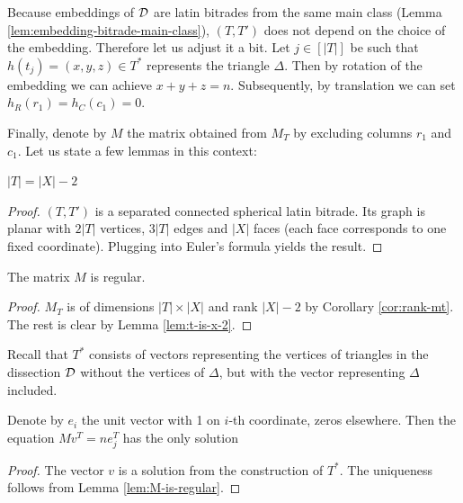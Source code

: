 Because embeddings of $\mathcal D$ are latin bitrades from the same main class (Lemma \ref{lem:embedding-bitrade-main-class}), $(T,T')$ does not depend on the choice of the embedding. Therefore let us adjust it a bit. Let $j \in [|T|]$ be such that $h(t_j) = (x,y,z) \in T^*$ represents the triangle $\Delta$. Then by rotation of the embedding we can achieve $x + y + z = n$. Subsequently, by translation we can set $h_R(r_1) = h_C(c_1) = 0$.

Finally, denote by $M$ the matrix obtained from $M_T$ by excluding columns $r_1$ and $c_1$. Let us state a few lemmas in this context:

\begin{lem}
\label{lem:t-is-x-2}
$|T| = |X|-2$
\end{lem}
\begin{proof}
$(T, T')$ is a separated connected spherical latin bitrade. Its graph is planar with $2|T|$ vertices, $3|T|$ edges and $|X|$ faces (each face corresponds to one fixed coordinate). Plugging into Euler's formula yields the result.
\end{proof}

\begin{lem}
\label{lem:M-is-regular}
The matrix $M$ is regular.
\end{lem}
\begin{proof}
$M_T$ is of dimensions $|T|\times|X|$ and rank $|X|-2$ by Corollary \ref{cor:rank-mt}. The rest is clear by Lemma \ref{lem:t-is-x-2}.
\end{proof}

Recall that $T^*$ consists of vectors representing the vertices of triangles in the dissection $\mathcal D$ without the vertices of $\Delta$, but with the vector representing $\Delta$ included.

\begin{lem}
\label{lem:solution-n-0-0-0}
Denote by $e_i$ the unit vector with 1 on $i$-th coordinate, zeros elsewhere. Then the equation $Mv^T = ne_j^T$ has the only solution
%
\end{lem}
\begin{proof}
The vector $v$ is a solution from the construction of $T^*$. The uniqueness follows from Lemma \ref{lem:M-is-regular}.
\end{proof}

